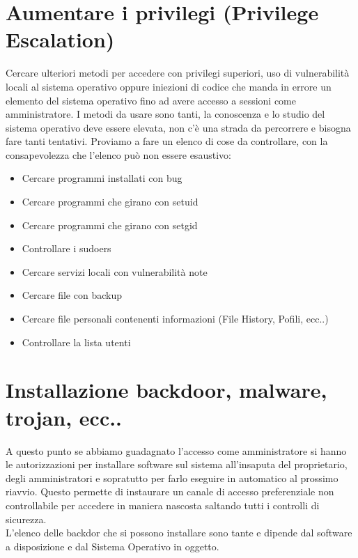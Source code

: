 \documentclass[a4paper,12pt]{article}
\begin{document}
\section{  Aumentare i privilegi (Privilege Escalation) }

Cercare ulteriori metodi per accedere con privilegi superiori, uso di vulnerabilità locali  al sistema operativo oppure iniezioni di codice che manda in  errore un elemento del sistema operativo fino ad avere accesso a sessioni come amministratore. I metodi da usare sono tanti, la conoscenza e lo studio del sistema operativo deve essere elevata, non c'è una strada da percorrere e bisogna fare tanti tentativi. 
Proviamo a fare un elenco di cose da controllare, con la consapevolezza che l'elenco può non essere esaustivo:\\
\begin{itemize}
   
  \item Cercare programmi installati con bug
  \item Cercare programmi che girano con setuid
  \item Cercare programmi che girano con setgid
  \item Controllare i sudoers
  \item Cercare servizi locali con vulnerabilità note
  \item Cercare file con backup 
  \item Cercare file personali contenenti informazioni (File History, Pofili, ecc..)
  \item Controllare la lista utenti
  
\end{itemize}

\section{  Installazione backdoor, malware, trojan, ecc..}

A questo punto se abbiamo guadagnato l'accesso come amministratore si hanno le autorizzazioni per installare software sul sistema all'insaputa del proprietario, degli amministratori e sopratutto per farlo eseguire in automatico al prossimo riavvio. Questo permette di instaurare un canale di accesso preferenziale non controllabile per accedere in maniera nascosta saltando tutti i controlli di sicurezza. \\
L'elenco delle backdor che si possono installare sono tante e dipende dal software a disposizione e dal Sistema Operativo in oggetto.
\end{document}
